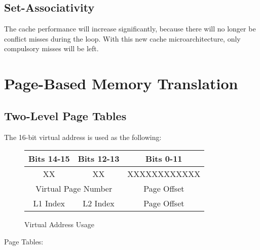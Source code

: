 \documentclass[10pt]{article}
\begin{document}
\subsection{Set-Associativity}
The cache performance will increase significantly, because there will no longer be conflict misses during the loop. With this new cache microarchitecture, only compulsory misses will be left. 

\cleardoublepage
\section{Page-Based Memory Translation}

\subsection{Two-Level Page Tables}
The 16-bit virtual address is used as the following:
\begin{figure}[H]
\centering
\begin{tabular}{|c|c|c|}
\hline
Bits 14-15 & Bits 12-13 & Bits 0-11 \\
\hline
XX & XX & XXXXXXXXXXXX \\
\hline
\multicolumn{2}{|c|}{Virtual Page Number} & Page Offset \\
\hline
L1 Index & L2 Index & Page Offset \\
\hline
\end{tabular}
\caption{Virtual Address Usage}
\end{figure}
Page Tables:
\end{document}
